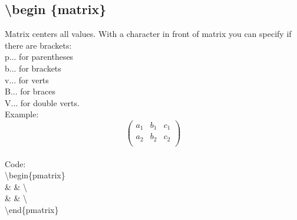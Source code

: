 \subsection{\textbackslash begin \{matrix\}}
Matrix centers all values. With a character in front of matrix you can specify if there are brackets:\\
    p... for parentheses\\
    b... for brackets\\
    v... for verts\\
    B... for braces\\
    V... for double verts.\\

Example:
    \[\begin{pmatrix}
        a_1 & b_1 & c_1 \\
        a_2 & b_2 & c_2 \\
    \end{pmatrix}\]
\ \\
Code:\\

\textbackslash begin\{pmatrix\}\\
    \qquad  \&  \&  \textbackslash \\
    \qquad  \&  \&  \textbackslash \\
\textbackslash end\{pmatrix\}\\